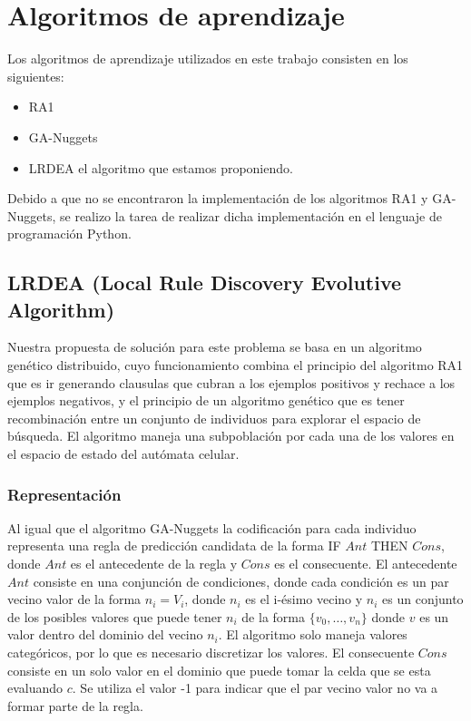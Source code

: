 \section{Algoritmos de aprendizaje}
Los algoritmos de aprendizaje utilizados en este trabajo consisten en los siguientes:
\begin{itemize}
	\item RA1
	\item GA-Nuggets
	\item LRDEA el algoritmo que estamos proponiendo.
\end{itemize}

Debido a que no se encontraron la implementación de los algoritmos RA1 y GA-Nuggets, se realizo la tarea de realizar dicha implementación en el lenguaje de programación Python.

\subsection{LRDEA (Local Rule Discovery Evolutive Algorithm)}

Nuestra propuesta de solución para este problema se basa en un algoritmo genético distribuido, cuyo funcionamiento combina el principio del algoritmo RA1 que es ir generando clausulas que cubran a los ejemplos positivos y rechace a los ejemplos negativos, y el principio de un algoritmo genético que es tener recombinación entre un conjunto de individuos para explorar el espacio de búsqueda.  El algoritmo maneja una subpoblación por cada una de los valores en el espacio de estado del autómata celular.

\subsubsection{Representación}

Al igual que el algoritmo GA-Nuggets la codificación para cada individuo representa una regla de predicción candidata de la forma IF $Ant$ THEN $Cons$, donde $Ant$ es el antecedente de la regla y $Cons$ es el consecuente. El antecedente $Ant$ consiste en una conjunción de condiciones, donde cada condición es un par vecino valor de la forma $n_i = V_i$, donde $n_i$ es el i-ésimo vecino y $n_{i}$ es un conjunto de los posibles valores que puede tener $n_i$ de la forma $\{v_{0},\dots,v_{n}\}$ donde $v$ es un valor dentro del dominio del vecino $n_i$. El algoritmo solo maneja valores categóricos, por lo que es necesario discretizar los valores. El consecuente $Cons$ consiste en un solo valor en el dominio que puede tomar la celda que se esta evaluando $c$. Se utiliza el valor -1 para indicar que el par vecino valor no va a formar parte de la regla.


